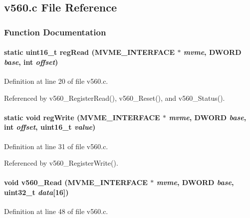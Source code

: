 \subsection{v560.c File Reference}
\label{v560_8c}


\subsubsection{Function Documentation}
\paragraph[{regRead}]{\setlength{\rightskip}{0pt plus 5cm}static uint16\_\-t regRead ({\bf MVME\_\-INTERFACE} $\ast$ {\em mvme}, \/  {\bf DWORD} {\em base}, \/  int {\em offset})}\hfill\label{v560_8c_a2356559ea09bb1038060090b3526cc09}


Definition at line 20 of file v560.c.

Referenced by v560\_\-RegisterRead(), v560\_\-Reset(), and v560\_\-Status().
\paragraph[{regWrite}]{\setlength{\rightskip}{0pt plus 5cm}static void regWrite ({\bf MVME\_\-INTERFACE} $\ast$ {\em mvme}, \/  {\bf DWORD} {\em base}, \/  int {\em offset}, \/  uint16\_\-t {\em value})}\hfill\label{v560_8c_a9ef4dda4884da2045dbb6d441deaf8fe}


Definition at line 31 of file v560.c.

Referenced by v560\_\-RegisterWrite().
\paragraph[{v560\_\-Read}]{\setlength{\rightskip}{0pt plus 5cm}void v560\_\-Read ({\bf MVME\_\-INTERFACE} $\ast$ {\em mvme}, \/  {\bf DWORD} {\em base}, \/  uint32\_\-t {\em data}\mbox{[}16\mbox{]})}\hfill\label{v560_8c_a3d40e677386cd39e9f29d40bd21dada3}


Definition at line 48 of file v560.c.
